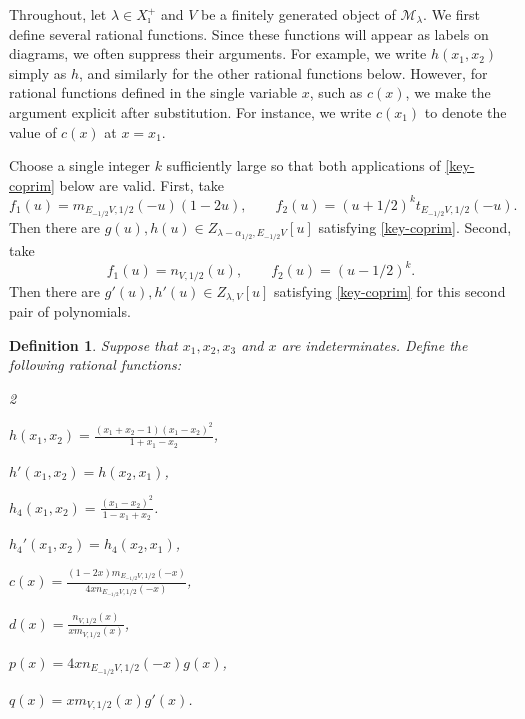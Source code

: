 \documentclass[a4,10pt]{amsart}
\numberwithin{equation}{section}
\newtheorem{Defn}[Theorem]{Definition}
\theoremstyle{definition}
\begin{document}
  Throughout, let  $\lambda\in X_\imath^+$ and $V$ be a finitely generated object
of $\mathcal M_\lambda$.
We first define several rational functions.
Since these functions will appear
as labels on diagrams,
we  often suppress their arguments. 
For example, we write
$h(x_1,x_2)$ simply as $h$,
and similarly for the other rational functions below. However, for rational functions defined in the single
variable $x$, such as $c(x)$, we make the argument explicit after substitution.
For instance, we write $c(x_1)$ to denote the value of $c(x)$ at $x=x_1$. 

{Choose a single integer $k$  sufficiently large so that both applications of \eqref{key-coprim} below are valid. First,  take}
\[
f_1(u)=m_{E_{-1/2}V, 1/2}(-u)(1-2u),
\qquad
f_2(u)=(u+1/2)^k t_{E_{-1/2}V, 1/2}(-u).
\]
Then there are $g(u), h(u)\in Z_{\lambda-\alpha_{1/2}, E_{-1/2}V}[u]$ satisfying \eqref{key-coprim}. Second,  {take}
\[
f_1(u)=n_{V,1/2}(u),\qquad
f_2(u)=(u-1/2)^k.
\]
Then there are $g'(u), h'(u)\in Z_{\lambda,V}[u]$ satisfying \eqref{key-coprim} for this second pair of polynomials.
\begin{Defn}\label{rationalff} Suppose that $x_1, x_2, x_3$ and $x$  are indeterminates. Define the following  rational functions:  
 \begin{multicols}{2}
 \item [(1)] $h(x_1,x_2)=\frac{(x_1+x_2-1)(x_1-x_2)^2}{1+x_1-x_2}$, 
\item [(2)] $h'(x_1, x_2)=h(x_2,x_1)$, 
\item [(3)]$h_4(x_1,x_2)=\frac{(x_1-x_2)^2} {1-x_1+x_2}$.
 \item [(4)] $h_4'(x_1, x_2)=h_4(x_2,x_1)$,
\item[(5)]   $c(x)=\frac{(1-2x)m_{E_{-1/2}V,1/2}(-x)}{4xn_{E_{-1/2}V,1/2}(-x)}$, \item [(6)] $d(x)=\frac{n_{V,1/2}(x)}{xm_{V,1/2}(x)}$, 
 \item [(7)]  $p(x)=4xn_{E_{-1/2}V,1/2}(-x)g(x)$,
\item[(8)]  $q(x)=xm_{V,1/2}(x)g'(x)$.
 \end{multicols}
\end{Defn}  
\end{document}
